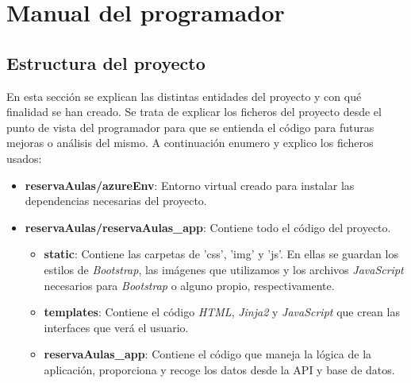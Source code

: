 \section{Manual del programador}
\subsection{Estructura del proyecto}
En esta sección se explican las distintas entidades del proyecto y con qué finalidad se han creado. Se trata de explicar los ficheros del proyecto desde el punto de vista del programador para que se entienda el código para futuras mejoras o análisis del mismo. A continuación enumero y explico los ficheros usados:
\begin{itemize}
    \item \textbf{reservaAulas/azureEnv}: Entorno virtual creado para instalar las dependencias necesarias del proyecto.
    \item \textbf{reservaAulas/reservaAulas\_app}: Contiene todo el código del proyecto.
    \begin{itemize}
        \item \textbf{static}: Contiene las carpetas de 'css', 'img' y 'js'. En ellas se guardan los estilos de \textit{Bootstrap}, las imágenes que utilizamos y los archivos \textit{JavaScript} necesarios para \textit{Bootstrap} o alguno propio, respectivamente.
        \item \textbf{templates}: Contiene el código \textit{HTML}, \textit{Jinja2} y \textit{JavaScript} que crean las interfaces que verá el usuario.
        \item \textbf{reservaAulas\_app}: Contiene el código que maneja la lógica de la aplicación, proporciona y recoge los datos desde la API y base de datos.
    \end{itemize}
\end{itemize}

